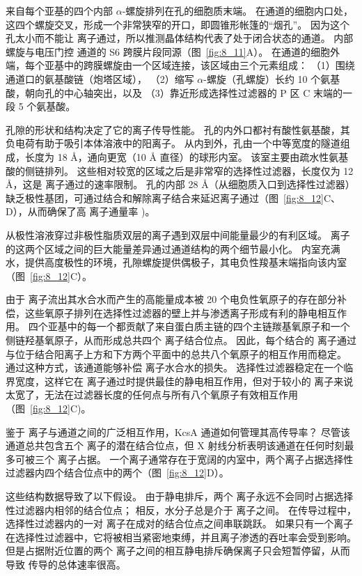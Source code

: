 来自每个亚基的四个内部 $\alpha$-螺旋排列在孔的细胞质末端。
在通道的细胞内口处，这四个螺旋交叉，形成一个非常狭窄的开口，即圆锥形帐篷的“烟孔”。
因为这个孔太小而不能让  离子通过，所以推测晶体结构代表了处于闭合状态的通道。
内部螺旋与电压门控  通道的 S6 跨膜片段同源（图~\ref{fig:8_11}A）。
在通道的细胞外端，每个亚基中的跨膜螺旋由一个区域连接，该区域由三个元素组成：
（1）围绕通道口的氨基酸链（炮塔区域），
（2）缩写 $\alpha$-螺旋（孔螺旋）长约 10 个氨基酸，朝向孔的中心轴突出，以及
（3）靠近形成选择性过滤器的 P 区 C 末端的一段 5 个氨基酸。


孔隙的形状和结构决定了它的离子传导性能。
孔的内外口都衬有酸性氨基酸，其负电荷有助于吸引本体溶液中的阳离子。
从内到外，孔由一个中等宽度的隧道组成，长度为 18 Å，通向更宽（10 Å 直径）的球形内室。
该室主要由疏水性氨基酸的侧链排列。
这些相对较宽的区域之后是非常窄的选择性过滤器，长度仅为 12 Å，这是  离子通过的速率限制。
孔的内部 28 Å（从细胞质入口到选择性过滤器）缺乏极性基团，可通过结合和解除离子结合来延迟离子通过（图~\ref{fig:8_12}C、D），从而确保了高  离子通量率 )。


从极性溶液穿过非极性脂质双层的离子遇到双层中间能量最少的有利区域。
 离子的这两个区域之间的巨大能量差异通过通道结构的两个细节最小化。
内室充满水，提供高度极性的环境，孔隙螺旋提供偶极子，其电负性羧基末端指向该内室（图~\ref{fig:8_12}C）。


由于  离子流出其水合水而产生的高能量成本被 20 个电负性氧原子的存在部分补偿，这些氧原子排列在选择性过滤器的壁上并与渗透离子形成有利的静电相互作用。 
四个亚基中的每一个都贡献了来自蛋白质主链的四个主链羰基氧原子和一个侧链羟基氧原子，从而形成总共四个  离子结合位点。
因此，每个结合的  离子通过与位于结合阳离子上方和下方两个平面中的总共八个氧原子的相互作用而稳定。 
通过这种方式，该通道能够补偿  离子水合水的损失。
选择性过滤器稳定在一个临界宽度，这样它在  离子通过时提供最佳的静电相互作用，但对于较小的  离子来说太宽了，无法在过滤器长度的任何点与所有八个氧原子有效相互作用（图~\ref{fig:8_12}C)。


鉴于  离子与通道之间的广泛相互作用，KcsA 通道如何管理其高传导率？
尽管该通道总共包含五个  离子的潜在结合位点，但 X 射线分析表明该通道在任何时刻最多可被三个  离子占据。
一个离子通常存在于宽阔的内室中，两个离子占据选择性过滤器内四个结合位点中的两个（图~\ref{fig:8_12}D）。


这些结构数据导致了以下假设。
由于静电排斥，两个  离子永远不会同时占据选择性过滤器内相邻的结合位点；
相反，水分子总是介于  离子之间。
在传导过程中，选择性过滤器内的一对  离子在成对的结合位点之间串联跳跃。
如果只有一个离子在选择性过滤器中，它将被相当紧密地束缚，并且离子渗透的吞吐率会受到影响。
但是占据附近位置的两个  离子之间的相互静电排斥确保离子只会短暂停留，从而导致  传导的总体速率很高。


